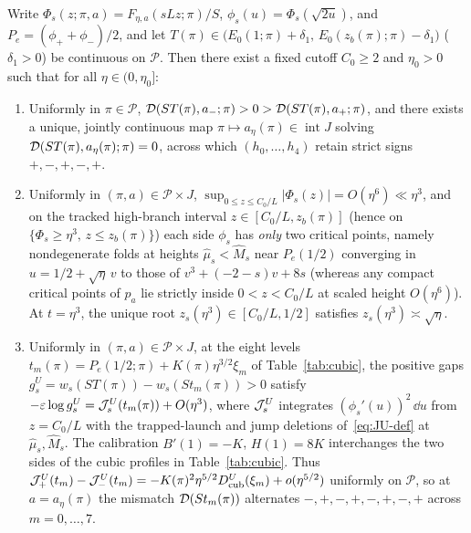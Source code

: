 \begin{proposition}
\begin{enumerate}
\end{enumerate}
Write $\Phi_s(z;\pi,a)=F_{\eta,a}(sLz;\pi)/S$, $\phi_s(u)=\Phi_s(\sqrt{2u})$, and $P_e=(\phi_++\phi_-)/2$, and let $T(\pi)\in\big(E_0(1;\pi)+\delta_1,\,E_0(z_b(\pi);\pi)-\delta_1\big)$ ($\delta_1>0$) be continuous on $\mathcal{P}$. Then there exist a fixed cutoff $C_0\ge 2$ and $\eta_0>0$ such that for all $\eta\in(0,\eta_0]$:
\begin{enumerate}
  \item[\textup{(i)}] Uniformly in $\pi\in\mathcal{P}$, $\mathcal{D}(ST(\pi),a_-;\pi)>0>\mathcal{D}(ST(\pi),a_+;\pi)$, and there exists a unique, jointly continuous map $\pi\mapsto a_\eta(\pi)\in\operatorname{int}J$ solving $\mathcal{D}(ST(\pi),a_\eta(\pi);\pi)=0$, across which $(h_0,\dots,h_4)$ retain strict signs $+,-,+,-,+$.
  \item[\textup{(ii)}] Uniformly in $(\pi,a)\in\mathcal{P}\times J$, $\sup_{0\le z\le C_0/L}|\Phi_s(z)|=O(\eta^6)\ll\eta^3$, and on the tracked high-branch interval $z\in[C_0/L,z_b(\pi)]$ (hence on $\{\Phi_s\ge\eta^3,\,z\le z_b(\pi)\}$) each side $\phi_s$ has \emph{only} two critical points, namely nondegenerate folds at heights $\widehat\mu_s<\widehat M_s$ near $P_e(1/2)$ converging in $u=1/2+\sqrt\eta\,v$ to those of $v^3+(-2-s)v+8s$ (whereas any compact critical points of $p_a$ lie strictly inside $0<z<C_0/L$ at scaled height $O(\eta^6)$). At $t=\eta^3$, the unique root $z_s(\eta^3)\in[C_0/L,1/2]$ satisfies $z_s(\eta^3)\asymp\sqrt\eta$.
  \item[\textup{(iii)}] Uniformly in $(\pi,a)\in\mathcal{P}\times J$, at the eight levels $t_m(\pi)=P_e(1/2;\pi)+K(\pi)\eta^{3/2}\xi_m$ of Table~\ref{tab:cubic}, the positive gaps $g_s^U=w_s(ST(\pi))-w_s(St_m(\pi))>0$ satisfy $-\varepsilon\log g_s^U=\mathcal{J}_s^U(t_m(\pi))+O(\eta^3)$, where $\mathcal{J}_s^U$ integrates $(\phi_s'(u))^2\,\dd u$ from $z=C_0/L$ with the trapped-launch and jump deletions of~\eqref{eq:JU-def} at $\widehat\mu_s,\widehat M_s$. The calibration $B'(1)=-K$, $H(1)=8K$ interchanges the two sides of the cubic profiles in Table~\ref{tab:cubic}. Thus $\mathcal{J}_+^U(t_m)-\mathcal{J}_-^U(t_m)=-K(\pi)^2\eta^{5/2}D_{\mathrm{cub}}^U(\xi_m)+o(\eta^{5/2})$ uniformly on $\mathcal{P}$, so at $a=a_\eta(\pi)$ the mismatch $\mathcal{D}(St_m(\pi))$ alternates $-,+,-,+,-,+,-,+$ across $m=0,\dots,7$.
\end{enumerate}
\end{proposition}


